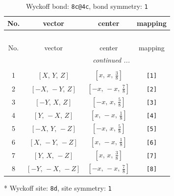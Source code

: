 \documentclass[fleqn,8pt]{jsarticle}
\begin{document}
\renewcommand{\arraystretch}{1.2}
\begin{longtable}{cccc}
\caption{Wyckoff bond: {\tt 8c@4c}, bond symmetry: {\tt 1}}
 \\
 \hline \hline
No. & vector & center & mapping \\ \hline \endfirsthead

\multicolumn{3}{l}{\tablename\ \thetable{}} \\
 \hline \hline
No. & vector & center & mapping \\ \hline \endhead

 \hline \hline
\multicolumn{3}{r}{\footnotesize\it continued ...} \\ \endfoot

 \hline \hline
\multicolumn{3}{r}{} \\ \endlastfoot

1 & $\left[ X,\, Y,\, Z \right]$ & $\left[ x,\, x,\, \frac{3}{8} \right]$ & {\tt [1]} \\ \hline
2 & $\left[ - X,\, - Y,\, Z \right]$ & $\left[ - x,\, - x,\, \frac{7}{8} \right]$ & {\tt [2]} \\ \hline
3 & $\left[ - Y,\, X,\, Z \right]$ & $\left[ - x,\, x,\, \frac{5}{8} \right]$ & {\tt [3]} \\ \hline
4 & $\left[ Y,\, - X,\, Z \right]$ & $\left[ x,\, - x,\, \frac{1}{8} \right]$ & {\tt [4]} \\ \hline
5 & $\left[ - X,\, Y,\, - Z \right]$ & $\left[ - x,\, x,\, \frac{5}{8} \right]$ & {\tt [5]} \\ \hline
6 & $\left[ X,\, - Y,\, - Z \right]$ & $\left[ x,\, - x,\, \frac{1}{8} \right]$ & {\tt [6]} \\ \hline
7 & $\left[ Y,\, X,\, - Z \right]$ & $\left[ x,\, x,\, \frac{3}{8} \right]$ & {\tt [7]} \\ \hline
8 & $\left[ - Y,\, - X,\, - Z \right]$ & $\left[ - x,\, - x,\, \frac{7}{8} \right]$ & {\tt [8]} \\
\end{longtable}
* Wyckoff site: {\tt 8d}, site symmetry: {\tt 1}
\renewcommand{\arraystretch}{1.2}
\end{document}
